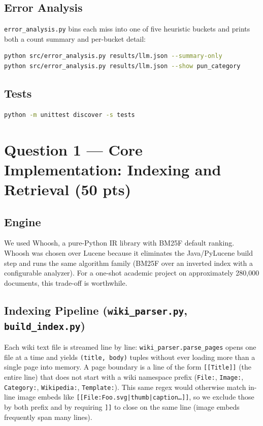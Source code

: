 \documentclass[11pt]{article}
\begin{document}
\subsection{Error Analysis}

\texttt{error\_analysis.py} bins each miss into one of five heuristic
buckets and prints both a count summary and per-bucket detail:

\begin{lstlisting}[language=bash]
python src/error_analysis.py results/llm.json --summary-only
python src/error_analysis.py results/llm.json --show pun_category
\end{lstlisting}

\subsection{Tests}

\begin{lstlisting}[language=bash]
python -m unittest discover -s tests
\end{lstlisting}

\section{Question 1 --- Core Implementation: Indexing and Retrieval (50 pts)}

\subsection{Engine}

We used Whoosh, a pure-Python IR library with BM25F default ranking.
Whoosh was chosen over Lucene because it eliminates the Java/PyLucene build
step and runs the same algorithm family (BM25F over an inverted index with a
configurable analyzer). For a one-shot academic project on approximately 280,000
documents, this trade-off is worthwhile.

\subsection{Indexing Pipeline (\texttt{wiki\_parser.py}, \texttt{build\_index.py})}

Each wiki text file is streamed line by line: \texttt{wiki\_parser.parse\_pages}
opens one file at a time and yields \texttt{(title, body)} tuples without ever
loading more than a single page into memory. A page boundary is a line of the
form \texttt{[[Title]]} (the entire line) that does not start with a wiki
namespace prefix (\texttt{File:}, \texttt{Image:}, \texttt{Category:},
\texttt{Wikipedia:}, \texttt{Template:}). This same regex would otherwise match
in-line image embeds like \texttt{[[File:Foo.svg|thumb|caption\ldots]]}, so we
exclude those by both prefix and by requiring \texttt{]]} to close on the same
line (image embeds frequently span many lines).
\end{document}
